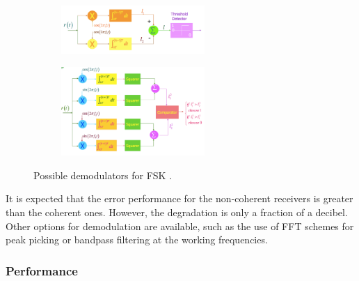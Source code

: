 \documentclass[12pt,a4paper,openright]{report}
\begin{document}
 \begin{figure}[H]
 \centering
\begin{subfigure}[h]{0.9\textwidth}
 \centering
    \includegraphics[width=0.6\textwidth]{fskdem1.pdf}
    \label{fig:FSKdemcoherent}

\end{subfigure}
\quad

\begin{subfigure}[H]{0.9\textwidth}
 \centering
    \includegraphics[width=0.6\textwidth]{fskdem2.pdf}
    \label{fig:FSKdemNoncoherent}
    \end{subfigure}
    \caption[Possible demodulators for FSK]{Possible demodulators for FSK \cite{DigModTech}.}
\end{figure}


It is expected that the error performance for the non-coherent receivers is greater than the coherent ones. However, the degradation is only a fraction of a decibel. Other options for demodulation are available, such as the use of FFT schemes for peak picking or bandpass filtering at the working frequencies.

 \subsubsection{Performance}
 
\end{document}
